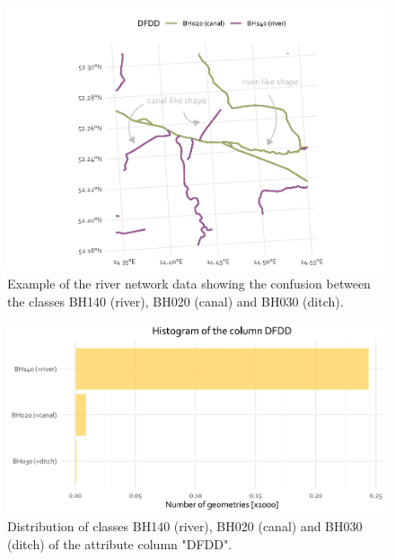 \documentclass[fleqn,10pt]{wlscirep}
\begin{document}
\normalsize

\footnotesize

\begin{figure}[H]

{\centering \includegraphics[width=0.8\linewidth]{data_descriptor/tex/figure-rivercanalconfusionplot-1} 

}

\caption{Example of the river network data showing the confusion between the classes BH140 (river), BH020 (canal) and BH030 (ditch).}\label{fig:rivercanalconfusionplot}
\end{figure}

\normalsize

\footnotesize

\begin{figure}[H]

{\centering \includegraphics[width=0.8\linewidth]{data_descriptor/tex/figure-dfddstatsbarplot-1} 

}

\caption{Distribution of classes BH140 (river), BH020 (canal) and BH030 (ditch) of the attribute column "DFDD".}\label{fig:dfddstatsbarplot}
\end{figure}

\normalsize

\footnotesize
\end{document}

